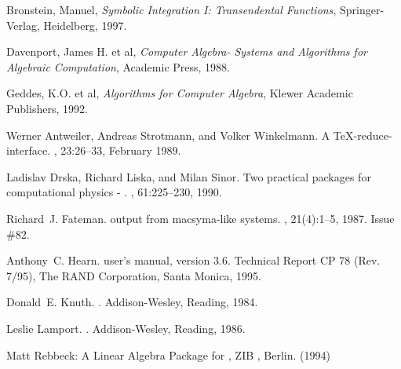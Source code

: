 \begin{thebibliography}{999}

 Bronstein, Manuel,
{\it Symbolic Integration I: Transendental Functions},
Springer-Verlag, Heidelberg, 1997.

 Davenport, James H. et al,
{\it Computer Algebra- Systems and Algorithms for Algebraic Computation},
Academic Press, 1988.

 Geddes, K.O. et al,
{\it Algorithms for Computer Algebra}, Klewer Academic \mbox{Publishers}, 1992.



Werner Antweiler, Andreas Strotmann, and Volker Winkelmann.
\newblock A {\TeX-{reduce}-interface}.
, 23:26--33, February 1989.

Ladislav Drska, Richard Liska, and Milan Sinor.
\newblock Two practical packages for computational physics - .
, 61:225--230, 1990.

Richard~J. Fateman.
\newblock \protect{\TeX\ } output from macsyma-like systems.
, 21(4):1--5, 1987.
\newblock Issue \#82.

Anthony~C. Hearn.
\newblock {} user's manual, version 3.6.
\newblock Technical Report CP 78 (Rev. 7/95), The RAND Corporation, Santa
  Monica, 1995.

Donald~E. Knuth.
.
\newblock Addison-Wesley, Reading, 1984.

Leslie Lamport.
.
\newblock Addison-Wesley, Reading, 1986.


 Matt Rebbeck: A Linear Algebra Package for {\REDUCE}, ZIB
, Berlin. (1994)





\end{thebibliography}
